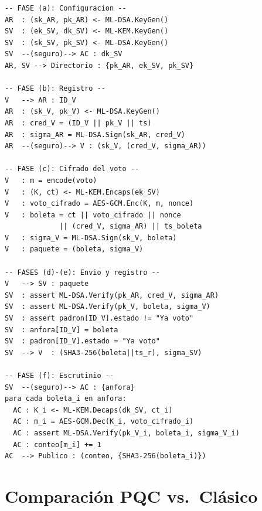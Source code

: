 \documentclass[12pt,a4paper,twoside,openright]{book}
\theoremstyle{plain}
\theoremstyle{definition}
\theoremstyle{remark}
\begin{document}
\begin{lstlisting}[caption={Protocolo de votaci\'on en notaci\'on Alice-Bob}]
-- FASE (a): Configuracion --
AR  : (sk_AR, pk_AR) <- ML-DSA.KeyGen()
SV  : (ek_SV, dk_SV) <- ML-KEM.KeyGen()
SV  : (sk_SV, pk_SV) <- ML-DSA.KeyGen()
SV  --(seguro)--> AC : dk_SV
AR, SV --> Directorio : {pk_AR, ek_SV, pk_SV}

-- FASE (b): Registro --
V   --> AR : ID_V
AR  : (sk_V, pk_V) <- ML-DSA.KeyGen()
AR  : cred_V = (ID_V || pk_V || ts)
AR  : sigma_AR = ML-DSA.Sign(sk_AR, cred_V)
AR  --(seguro)--> V : (sk_V, (cred_V, sigma_AR))

-- FASE (c): Cifrado del voto --
V   : m = encode(voto)
V   : (K, ct) <- ML-KEM.Encaps(ek_SV)
V   : voto_cifrado = AES-GCM.Enc(K, m, nonce)
V   : boleta = ct || voto_cifrado || nonce
             || (cred_V, sigma_AR) || ts_boleta
V   : sigma_V = ML-DSA.Sign(sk_V, boleta)
V   : paquete = (boleta, sigma_V)

-- FASES (d)-(e): Envio y registro --
V   --> SV : paquete
SV  : assert ML-DSA.Verify(pk_AR, cred_V, sigma_AR)
SV  : assert ML-DSA.Verify(pk_V, boleta, sigma_V)
SV  : assert padron[ID_V].estado != "Ya voto"
SV  : anfora[ID_V] = boleta
SV  : padron[ID_V].estado = "Ya voto"
SV  --> V  : (SHA3-256(boleta||ts_r), sigma_SV)

-- FASE (f): Escrutinio --
SV  --(seguro)--> AC : {anfora}
para cada boleta_i en anfora:
  AC : K_i <- ML-KEM.Decaps(dk_SV, ct_i)
  AC : m_i = AES-GCM.Dec(K_i, voto_cifrado_i)
  AC : assert ML-DSA.Verify(pk_V_i, boleta_i, sigma_V_i)
  AC : conteo[m_i] += 1
AC  --> Publico : (conteo, {SHA3-256(boleta_i)})
\end{lstlisting}

\chapter{Comparaci\'on PQC vs.\ Cl\'asico}
\label{app:comparacion}
\end{document}
